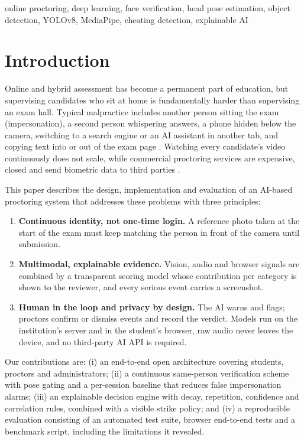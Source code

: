 \documentclass[conference]{IEEEtran}
\begin{document}
\begin{IEEEkeywords}
online proctoring, deep learning, face verification, head pose estimation, object detection, YOLOv8, MediaPipe, cheating detection, explainable AI
\end{IEEEkeywords}

\section{Introduction}
Online and hybrid assessment has become a permanent part of education, but supervising candidates who sit at home is fundamentally harder than supervising an exam hall. Typical malpractice includes another person sitting the exam (impersonation), a second person whispering answers, a phone hidden below the camera, switching to a search engine or an AI assistant in another tab, and copying text into or out of the exam page \cite{nigam2021review,hussein2020evaluation}. Watching every candidate's video continuously does not scale, while commercial proctoring services are expensive, closed and send biometric data to third parties \cite{coghlan2021ethics}.

This paper describes the design, implementation and evaluation of an AI-based proctoring system that addresses these problems with three principles:
\begin{enumerate}
\item \textbf{Continuous identity, not one-time login.} A reference photo taken at the start of the exam must keep matching the person in front of the camera until submission.
\item \textbf{Multimodal, explainable evidence.} Vision, audio and browser signals are combined by a transparent scoring model whose contribution per category is shown to the reviewer, and every serious event carries a screenshot.
\item \textbf{Human in the loop and privacy by design.} The AI warns and flags; proctors confirm or dismiss events and record the verdict. Models run on the institution's server and in the student's browser, raw audio never leaves the device, and no third-party AI API is required.
\end{enumerate}

Our contributions are: (i) an end-to-end open architecture covering students, proctors and administrators; (ii) a continuous same-person verification scheme with pose gating and a per-session baseline that reduces false impersonation alarms; (iii) an explainable decision engine with decay, repetition, confidence and correlation rules, combined with a visible strike policy; and (iv) a reproducible evaluation consisting of an automated test suite, browser end-to-end tests and a benchmark script, including the limitations it revealed.
\end{document}

